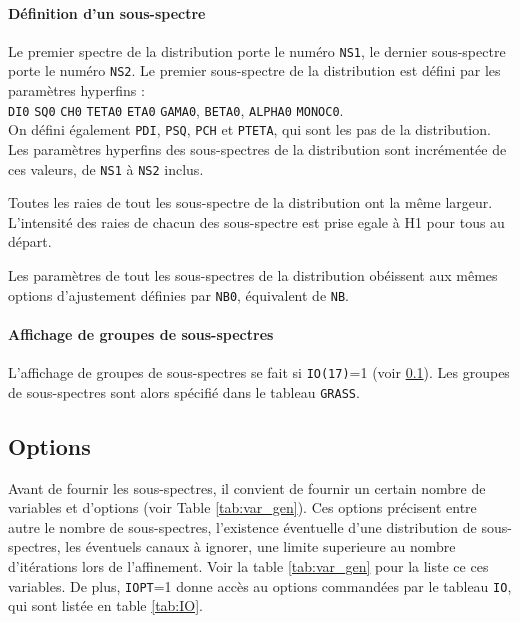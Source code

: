 \paragraph{Définition d'un sous-spectre}
Le premier spectre de la distribution porte le numéro \lstinline{NS1}, le dernier sous-spectre porte le numéro \lstinline{NS2}.
Le premier sous-spectre de la distribution  est défini par les paramètres hyperfins : \\

\lstinline{DI0} \lstinline{SQ0} \lstinline{CH0} \lstinline{TETA0} \lstinline{ETA0} \lstinline{GAMA0}, \lstinline{BETA0}, \lstinline{ALPHA0} \lstinline{MONOC0}. \\

On défini également \lstinline{PDI}, \lstinline{PSQ}, \lstinline{PCH} et \lstinline{PTETA}, qui sont les pas de la distribution.
Les paramètres hyperfins des sous-spectres de la distribution  sont incrémentée de ces valeurs, de \lstinline{NS1} à \lstinline{NS2} inclus.

Toutes les raies de tout les sous-spectre de la distribution ont la même largeur. L'intensité des raies de chacun des sous-spectre est prise egale à H1 pour tous au départ.

Les paramètres de tout les sous-spectres de la distribution obéissent aux mêmes options d'ajustement définies par \lstinline{NB0}, équivalent de \lstinline{NB}.

\paragraph{Affichage de groupes de sous-spectres}
L'affichage de groupes de sous-spectres se fait si  \lstinline{IO(17)}=1 (voir \ref{part:options}). 
Les groupes de sous-spectres sont alors spécifié dans le tableau \lstinline{GRASS}. 

\FloatBarrier
\subsection{Options}
\label{part:options}
Avant de fournir les sous-spectres, il convient de fournir un certain nombre de variables et d'options (voir Table \ref{tab:var_gen}).
Ces options précisent entre autre le nombre de sous-spectres, l'existence éventuelle d'une distribution de sous-spectres, les éventuels canaux à ignorer, une limite superieure au nombre d'itérations lors de l'affinement.
Voir la table \ref{tab:var_gen} pour la liste ce ces variables.
De plus, \lstinline{IOPT}=1 donne accès au options commandées par le tableau \lstinline{IO}, qui sont listée en table \ref{tab:IO}. 

